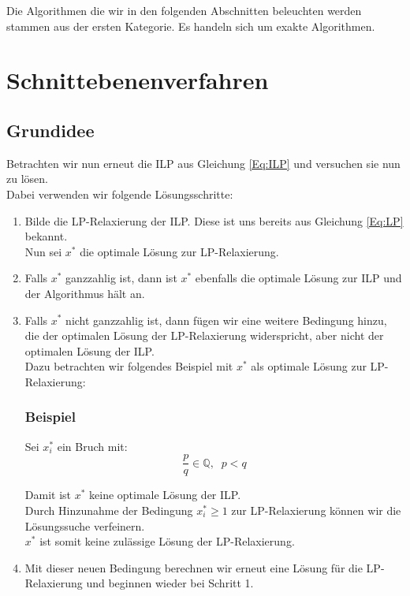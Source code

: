 \documentclass[tog]{acmsiggraph}
\begin{document}
Die Algorithmen die wir in den folgenden Abschnitten beleuchten werden stammen aus der ersten Kategorie. Es handeln sich um exakte Algorithmen. 

\section{Schnittebenenverfahren}

\subsection*{Grundidee}

Betrachten wir nun erneut die ILP aus Gleichung \ref{Eq:ILP} und versuchen sie nun zu lösen.\\
Dabei verwenden wir folgende Lösungsschritte:
\begin{enumerate}
\item Bilde die LP-Relaxierung der ILP. Diese ist uns bereits aus Gleichung \ref{Eq:LP} bekannt.\\ Nun sei $x^{*}$ die optimale Lösung zur LP-Relaxierung.
\item Falls $x^{*}$ ganzzahlig ist, dann ist $x^{*}$ ebenfalls die optimale Lösung zur ILP und der Algorithmus hält an.
\item Falls $x^{*}$ nicht ganzzahlig ist, dann fügen wir eine weitere Bedingung hinzu, die der optimalen Lösung der LP-Relaxierung widerspricht, aber nicht der optimalen Lösung der ILP.\\
Dazu betrachten wir folgendes Beispiel mit $x^{*}$ als optimale Lösung zur LP-Relaxierung:\\

\subsubsection*{Beispiel}
Sei $x^{*}_{i}$ ein Bruch mit:
\large
\begin{equation}
\frac{p}{q} \in \mathbb{Q},\;\; p < q \nonumber
\end{equation}
\normalsize

Damit ist $x^{*}$ keine optimale Lösung der ILP.\\
Durch Hinzunahme der Bedingung $x^{*}_{i} \ge 1$ zur LP-Relaxierung können wir die Lösungssuche verfeinern.\\
$x^{*}$ ist somit keine zulässige Lösung der LP-Relaxierung.

\item Mit dieser neuen Bedingung berechnen wir erneut eine Lösung für die LP-Relaxierung und beginnen wieder bei Schritt 1.

\end{enumerate}
\end{document}
